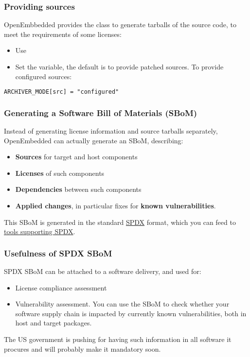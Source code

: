 \begin{frame}[fragile]
  \frametitle{Providing sources}
  OpenEmbbedded provides the  class to generate
  tarballs of the source code, to meet the requirements of some licenses:
  \begin{itemize}
  \item Use 
  \item Set the  variable, the default is to
    provide patched sources. To provide configured sources:
  \end{itemize}
    \begin{block}{}
      \fontsize{9}{9}\selectfont
      \begin{verbatim}
ARCHIVER_MODE[src] = "configured"
      \end{verbatim}
    \end{block}
\end{frame}

\begin{frame}
  \frametitle{Generating a Software Bill of Materials (SBoM)}
  Instead of generating license information and source tarballs separately,
  OpenEmbedded can actually generate an SBoM, describing:
  \begin{itemize}
    \item {\bf Sources} for target and host components
    \item {\bf Licenses} of such components
    \item {\bf Dependencies} between such components
    \item {\bf Applied changes}, in particular fixes for {\bf known vulnerabilities}.
  \end{itemize}
  This SBoM is generated in the standard \href{https://spdx.dev/}{SPDX} format,
  which you can feed to \href{https://spdx.dev/resources/tools/}{tools supporting SPDX}.
\end{frame}

\begin{frame}
  \frametitle{Usefulness of SPDX SBoM}
  SPDX SBoM can be attached to a software delivery, and used for:
  \begin{itemize}
     \item License compliance assessment
     \item Vulnerability assessment. You can use the SBoM to check
           whether your software supply chain is impacted by currently known
           vulnerabilities, both in host and target packages.
  \end{itemize}
  The US government is pushing for having such information
  in all software it procures and will probably make it mandatory soon.
\end{frame}

